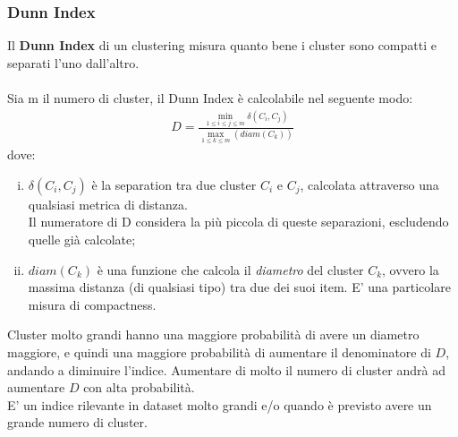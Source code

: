\subsubsection{Dunn Index}
Il \textbf{Dunn Index} di un clustering misura quanto bene i cluster sono compatti e separati l'uno dall'altro.\\
\\
Sia m il numero di cluster, il Dunn Index è calcolabile nel seguente modo:
\begin{align}
	D = \frac{\min_{1\le i \le j \le m}\delta(C_i, C_j)}{\max_{1 \le k \le m}(diam(C_k))}
\end{align}
dove:
\begin{enumerate}[(i)]
	\item $ \delta(C_i, C_j) $ è la separation tra due cluster $C_i$ e $C_j$, calcolata attraverso una qualsiasi metrica di distanza.\\
	Il numeratore di D considera la più piccola di queste separazioni, escludendo quelle già calcolate;
	\item $ diam(C_k) $ è una funzione che calcola il \textit{diametro} del cluster $C_k$, ovvero la massima distanza (di qualsiasi tipo) tra due dei suoi item. E' una particolare misura di compactness.
\end{enumerate}
Cluster molto grandi hanno una maggiore probabilità di avere un diametro maggiore, e quindi una maggiore probabilità di aumentare il denominatore di $D$, andando a diminuire l'indice. Aumentare di molto il numero di cluster andrà ad aumentare $D$ con alta probabilità.\\
E' un indice rilevante in dataset molto grandi e/o quando è previsto avere un grande numero di cluster.

